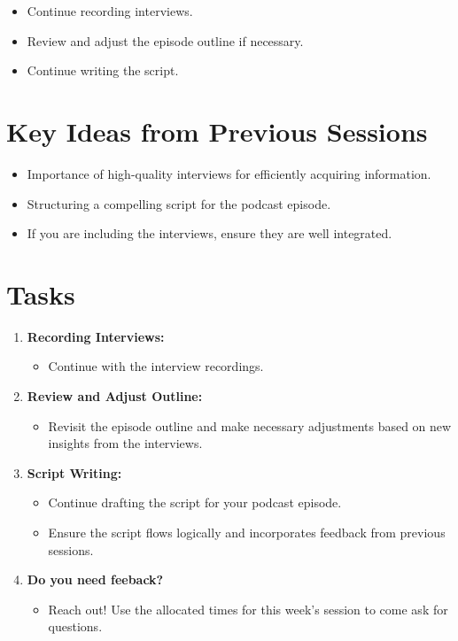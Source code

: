 \documentclass[
  letterpaper,
  DIV=11,
  numbers=noendperiod]{scrreprt}
\providecommand{\tightlist}{%
  \setlength{\itemsep}{0pt}\setlength{\parskip}{0pt}}\usepackage{longtable,booktabs,array}
\begin{document}
\begin{itemize}
\tightlist
\item
  Continue recording interviews.
\item
  Review and adjust the episode outline if necessary.
\item
  Continue writing the script.
\end{itemize}

\section{Key Ideas from Previous
Sessions}\label{key-ideas-from-previous-sessions-1}

\begin{itemize}
\tightlist
\item
  Importance of high-quality interviews for efficiently acquiring
  information.
\item
  Structuring a compelling script for the podcast episode.
\item
  If you are including the interviews, ensure they are well integrated.
\end{itemize}

\section{Tasks}\label{tasks-2}

\begin{enumerate}
\def\labelenumi{\arabic{enumi}.}
\tightlist
\item
  \textbf{Recording Interviews:}

  \begin{itemize}
  \tightlist
  \item
    Continue with the interview recordings.
  \end{itemize}
\item
  \textbf{Review and Adjust Outline:}

  \begin{itemize}
  \tightlist
  \item
    Revisit the episode outline and make necessary adjustments based on
    new insights from the interviews.
  \end{itemize}
\item
  \textbf{Script Writing:}

  \begin{itemize}
  \tightlist
  \item
    Continue drafting the script for your podcast episode.
  \item
    Ensure the script flows logically and incorporates feedback from
    previous sessions.
  \end{itemize}
\item
  \textbf{Do you need feeback?}

  \begin{itemize}
  \tightlist
  \item
    Reach out! Use the allocated times for this week's session to come
    ask for questions.
  \end{itemize}
\end{enumerate}
\end{document}
